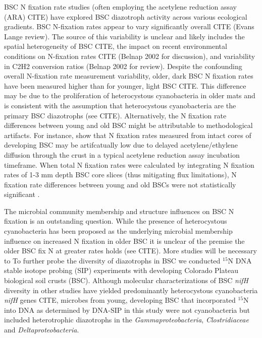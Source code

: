 BSC N fixation rate studies (often employing the acetylene reduction assay (ARA) CITE) have explored BSC diazotroph activity across various ecological gradients. BSC N-fixation rates appear to vary significantly overall CITE (Evans Lange review). The source of this variability is unclear and likely includes the spatial heterogeneity of BSC CITE, the impact on recent environmental conditions on N-fixation rates CITE (Belnap 2002 for discussion), and variability in C2H2 conversion ratios (Belnap 2002 for review). Despite the confounding overall N-fixation rate measurement variability, older, dark BSC N fixation rates have been measured higher than for younger, light BSC CITE. This difference may be due to the proliferation of heterocystous cyanobacteria in older mats and is consistent with the assumption that heterocystous cyanobacteria are the primary BSC diazotrophs (see CITE). Alternatively, the N fixation rate differences between young and old BSC might be attributable to methodological artifacts. For instance, \citet{15643930} show that N fixation rates measured from intact cores of developing BSC may be artifcatually low due to delayed acetylene/ethylene diffusion through the crust in a typical acetylene reduction assay incubation timeframe. When total N fixation rates were calculated by integrating N fixation rates of 1-3 mm depth BSC core slices (thus mitigating flux limitations), N fixation rate differences between young and old BSCs were not statistically significant \cite{15643930}.

The microbial community membership and structure influences on BSC N fixation is an outstanding question. While the presence of heterocystous cyanobacteria has been proposed as the underlying microbial membership influence on increased N fixation in older BSC it is unclear of the premise the older BSC fix N at greater rates holds (see CITE). More studies will be necessary to To further probe the diversity of diazotrophs in BSC we conducted $^{15}$N DNA stable isotope probing (SIP) experiments with developing Colorado Plateau biological soil crusts (BSC). Although molecular characterizations of BSC \textit{nifH} diversity in other studies have yielded predominantly heterocystous cyanobacteria \textit{nifH} genes CITE, microbes from young, developing BSC that incorporated $^{15}$N into DNA as determined by DNA-SIP in this study were not cyanobacteria but included heterotrophic diazotrophs in the \textit{Gammaproteobacteria}, \textit{Clostridiaceae} and \textit{Deltaproteobacteria}.